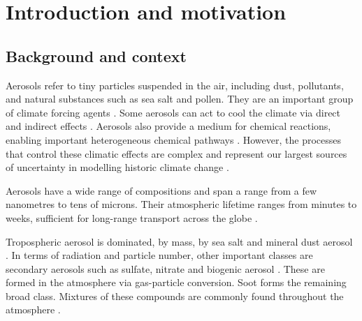 
\chapter{Introduction and motivation}  %
\label{ch1}

\ifpdf
    \graphicspath{{Chapter1/Figs/Raster/}{Chapter1/Figs/PDF/}{Chapter1/Figs/}}
\else
    \graphicspath{{Chapter1/Figs/Vector/}{Chapter1/Figs/}}
\fi




\section{Background and context}


Aerosols refer to tiny particles suspended in the air, including dust, pollutants, and natural substances such as sea salt and pollen. They are an important group of climate forcing agents \citep{forsterEarthEnergyBudget2021}. Some aerosols can act to cool the climate via direct and indirect effects \citep{angstromAtmosphericTransmissionSun1929, twomeyInfluencePollutionShortwave1977, charlsonPerturbationNorthernHemisphere1991,szopaShortlivedClimateForcers2021}.  Aerosols also provide a medium for chemical reactions, enabling important heterogeneous chemical pathways \citep{seinfeldAtmosphericChemistryPhysics2016}. However, the processes that control these climatic effects are complex and represent our largest sources of uncertainty in modelling historic climate change \citep{ghanChallengesConstrainingAnthropogenic2016, forsterEarthEnergyBudget2021}.

Aerosols have a wide range of compositions and span a range from a few nanometres to tens of microns.  Their atmospheric lifetime ranges from minutes to weeks, sufficient for long-range transport across the globe \citep{liScatteringAbsorbingAerosols2022}.  

Tropospheric aerosol is dominated, by mass, by sea salt and mineral dust aerosol \citep{szopaShortlivedClimateForcers2021}.  In terms of radiation and particle number, other important classes are secondary aerosols such as sulfate, nitrate and biogenic aerosol \citep{liScatteringAbsorbingAerosols2022}. These are formed in the atmosphere via gas-particle conversion.  Soot forms the remaining broad class.  Mixtures of these compounds are commonly found throughout the atmosphere \citep[e.g.][]{jimenezEvolutionOrganicAerosols2009, bauerTurningPointAerosol2022}.

